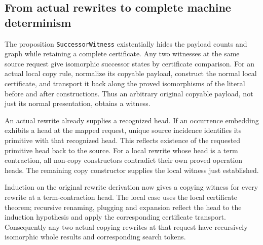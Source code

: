 

\subsection{From actual rewrites to complete machine determinism}

The proposition \texttt{SuccessorWitness} existentially hides the payload
counts and graph while retaining a complete certificate. Any two witnesses
at the same source request give isomorphic successor states by certificate
comparison. For an actual local copy rule, normalize its copyable payload,
construct the normal local certificate, and transport it back along the
proved isomorphisms of the literal before and after constructions. Thus an
arbitrary original copyable payload, not just its normal presentation,
obtains a witness.




An actual rewrite already supplies a recognized head. If an occurrence
embedding exhibits a head at the mapped request, unique source incidence
identifies its primitive with that recognized head. This reflects existence
of the requested primitive head back to the source. For a local rewrite whose
head is a term contraction, all non-copy constructors contradict their own
proved operation heads. The remaining copy constructor supplies the local
witness just established.



Induction on the original rewrite derivation now gives a copying witness
for every rewrite at a term-contraction head. The local case uses the local
certificate theorem; recursive renaming, plugging and expansion reflect the
head to the induction hypothesis and apply the corresponding certificate
transport. Consequently any two actual copying rewrites at that request have
recursively isomorphic whole results and corresponding search tokens.

